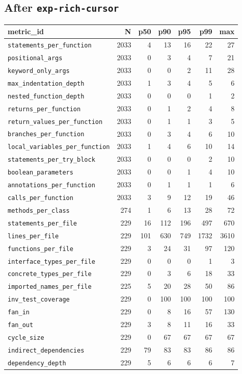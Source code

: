 \documentclass[11pt]{article}
\begin{document}
\subsection{After \texttt{exp-rich-cursor}}
\label{app:kiss-cursor}

{\scriptsize
\begin{longtable}{@{}lrrrrrr@{}}
  \toprule
  metric\_id & N & p50 & p90 & p95 & p99 & max \\
  \midrule
  \endhead
  \texttt{statements\_per\_function} & 2033 & 4 & 13 & 16 & 22 & 27 \\
  \texttt{positional\_args} & 2033 & 0 & 3 & 4 & 7 & 21 \\
  \texttt{keyword\_only\_args} & 2033 & 0 & 0 & 2 & 11 & 28 \\
  \texttt{max\_indentation\_depth} & 2033 & 1 & 3 & 4 & 5 & 6 \\
  \texttt{nested\_function\_depth} & 2033 & 0 & 0 & 0 & 1 & 2 \\
  \texttt{returns\_per\_function} & 2033 & 0 & 1 & 2 & 4 & 8 \\
  \texttt{return\_values\_per\_function} & 2033 & 0 & 1 & 1 & 3 & 5 \\
  \texttt{branches\_per\_function} & 2033 & 0 & 3 & 4 & 6 & 10 \\
  \texttt{local\_variables\_per\_function} & 2033 & 1 & 4 & 6 & 10 & 14 \\
  \texttt{statements\_per\_try\_block} & 2033 & 0 & 0 & 0 & 2 & 10 \\
  \texttt{boolean\_parameters} & 2033 & 0 & 0 & 1 & 4 & 10 \\
  \texttt{annotations\_per\_function} & 2033 & 0 & 1 & 1 & 1 & 6 \\
  \texttt{calls\_per\_function} & 2033 & 3 & 9 & 12 & 19 & 46 \\
  \texttt{methods\_per\_class} & 274 & 1 & 6 & 13 & 28 & 72 \\
  \texttt{statements\_per\_file} & 229 & 16 & 112 & 196 & 497 & 670 \\
  \texttt{lines\_per\_file} & 229 & 101 & 630 & 749 & 1732 & 3610 \\
  \texttt{functions\_per\_file} & 229 & 3 & 24 & 31 & 97 & 120 \\
  \texttt{interface\_types\_per\_file} & 229 & 0 & 0 & 0 & 1 & 3 \\
  \texttt{concrete\_types\_per\_file} & 229 & 0 & 3 & 6 & 18 & 33 \\
  \texttt{imported\_names\_per\_file} & 225 & 5 & 20 & 28 & 50 & 86 \\
  \texttt{inv\_test\_coverage} & 229 & 0 & 100 & 100 & 100 & 100 \\
  \texttt{fan\_in} & 229 & 0 & 8 & 16 & 57 & 130 \\
  \texttt{fan\_out} & 229 & 3 & 8 & 11 & 16 & 33 \\
  \texttt{cycle\_size} & 229 & 0 & 67 & 67 & 67 & 67 \\
  \texttt{indirect\_dependencies} & 229 & 79 & 83 & 83 & 86 & 86 \\
  \texttt{dependency\_depth} & 229 & 5 & 6 & 6 & 6 & 7 \\
  \bottomrule
\end{longtable}
}
\end{document}
